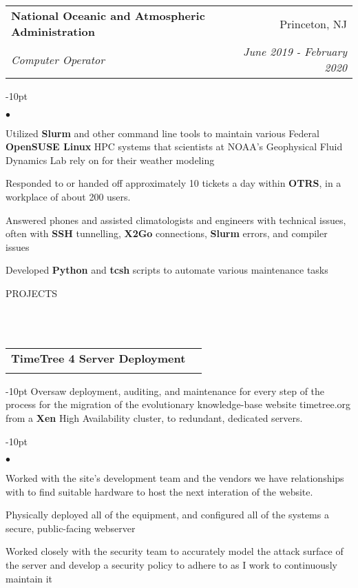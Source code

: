 \documentclass[12pt]{article}
\makeatletter
\newcommand{\header}[1]{
	\vspace*{12pt} %
	{\hspace*{-14pt}\vspace*{6pt} #1}
	\vspace*{-6pt} 
	\lineunder
}
\newcommand{\lineunder}{
	\vspace*{-8pt} \\ 
	\hspace*{-18pt} 
	\hrulefill \\
}
\newcommand{\subheading}[4]{
 	\vspace{5pt}
    	\begin{tabular*}{1.01\textwidth}
    		{l@{\extracolsep{\fill}}r}
      		\hspace{-16pt}\textbf{#1} & #2 \\
      		\hspace{-16pt}\textit{\small#3} & \textit{\small #4} \\
    	\end{tabular*}
    \vspace{-4pt}
}
\newenvironment{achievements}{
\begin{adjustwidth}{-10pt}{}
  \begin{list}{$\bullet$}{
  	\topsep 0pt \itemsep -4pt}}
  	{\vspace*{2pt}\end{list}
\end{adjustwidth}
}
\makeatother
\begin{document}
\subheading
	{National Oceanic and Atmospheric Administration}{Princeton, NJ}
	{Computer Operator}{June 2019 - February 2020}
	\begin{achievements}
		\item Utilized \textbf{Slurm} and other command line tools to maintain various Federal \textbf{OpenSUSE Linux} HPC systems that scientists at NOAA's Geophysical Fluid Dynamics Lab rely on for their weather modeling
		\item Responded to or handed off approximately 10 tickets a day within \textbf{OTRS}, in a workplace of about 200 users.	
		\item Answered phones and assisted climatologists and engineers with technical issues, often with \textbf{SSH} tunnelling, \textbf{X2Go} connections, \textbf{Slurm} errors, and compiler issues
		\item Developed \textbf{Python} and \textbf{tcsh} scripts to automate various maintenance tasks
		
		
	\end{achievements}


\vspace{-8pt}
\header{PROJECTS}

	
\subheading{TimeTree 4 Server Deployment}{}{}{}
	\vspace{-15pt}
	\begin{adjustwidth}{-10pt}{}
	Oversaw deployment, auditing, and maintenance for every step of the process for the migration of the evolutionary knowledge-base website timetree.org from a \textbf{Xen} High Availability cluster, to redundant, dedicated servers.
	\end{adjustwidth}
	\begin{achievements}		
		\item Worked with the site's development team and the vendors we have relationships with to find suitable hardware to host the next interation of the website.
		\item Physically deployed all of the equipment, and configured all of the systems a secure, public-facing webserver
		\item Worked closely with the security team to accurately model the attack surface of the server and develop a security policy to adhere to as I work to continuously maintain it
	\end{achievements}
\end{document}
